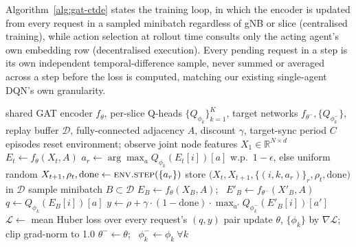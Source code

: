 \documentclass[pdflatex,sn-basic,Numbered]{sn-jnl}%
\begin{document}
Algorithm~\ref{alg:gat-ctde} states the training loop, in which the encoder is updated from every request in a sampled minibatch regardless of gNB or slice (centralised training), while action selection at rollout time consults only the acting agent's own embedding row (decentralised execution). Every pending request in a step is its own independent
temporal-difference sample, never summed or averaged across a step
before the loss is computed, matching our existing single-agent DQN's
own granularity.

\begin{algorithm}[t]
\caption{GAT-CTDE: centralised training, decentralised execution}
\label{alg:gat-ctde}
\begin{algorithmic}[1]
\REQUIRE shared GAT encoder $f_\theta$, per-slice Q-heads $\{Q_{\phi_k}\}_{k=1}^{K}$, target networks $f_{\theta^-}, \{Q_{\phi_k^-}\}$, replay buffer $\mathcal{D}$, fully-connected adjacency $A$, discount $\gamma$, target-sync period $C$ episodes
  \STATE reset environment; observe joint node features $X_1 \in \mathbb{R}^{N \times d}$
    \STATE $E_t \gets f_\theta(X_t, A)$ 
      \STATE $a_r \gets \arg\max_a Q_{\phi_k}(E_t[i])[a]$ w.p.\ $1{-}\epsilon$, else uniform random 
    \ENDFOR
    \STATE $X_{t+1}, \rho_t, \text{done} \gets \textsc{env.step}(\{a_r\})$
    \STATE store $\big(X_t, X_{t+1}, \{(i,k,a_r)\}_r, \rho_t, \text{done}\big)$ in $\mathcal{D}$
      \STATE sample minibatch $B \subset \mathcal{D}$
      \STATE $E_B \gets f_\theta(X_B, A)$; \ $E'_B \gets f_{\theta^-}(X'_B, A)$ 
        \STATE $q \gets Q_{\phi_k}(E_B[i])[a]$
        \STATE $y \gets \rho + \gamma \cdot (1{-}\text{done}) \cdot \max_{a'} Q_{\phi_k^-}(E'_B[i])[a']$
      \ENDFOR
      \STATE $\mathcal{L} \gets$ mean Huber loss over every request's $(q, y)$ pair 
      \STATE update $\theta$, $\{\phi_k\}$ by $\nabla \mathcal{L}$; clip grad-norm to 1.0
    \ENDIF
  \ENDFOR
    \STATE $\theta^- \gets \theta$; \ $\phi_k^- \gets \phi_k\ \forall k$
  \ENDIF
\ENDFOR
\end{algorithmic}
\end{algorithm}
\end{document}

